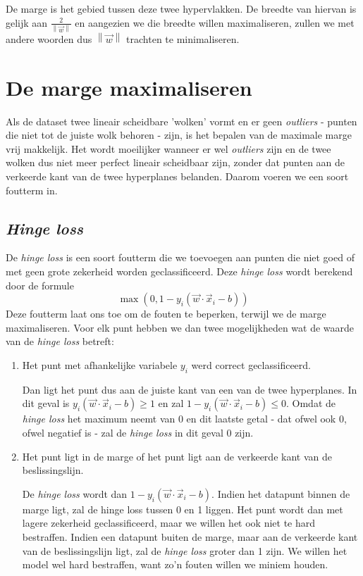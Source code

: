 \documentclass[twoside, kulak]{kulakreport}
\newcommand{\norm}[1]{\left\| #1 \right\|}
\begin{document}
	De marge is het gebied tussen deze twee hypervlakken. De breedte van hiervan is gelijk aan \(\frac{2}{\norm{\vec{w}}}\) en aangezien we die breedte willen maximaliseren, zullen we met andere woorden dus \(\norm{\vec{w}}\) trachten te minimaliseren.
	
	\section{De marge maximaliseren}
	
	Als de dataset twee lineair scheidbare 'wolken' vormt en er geen \textit{outliers} - punten die niet tot de juiste wolk behoren - zijn, is het bepalen van de maximale marge vrij makkelijk. Het wordt moeilijker wanneer er wel \textit{outliers} zijn en de twee wolken dus niet meer perfect lineair scheidbaar zijn, zonder dat punten aan de verkeerde kant van de twee hyperplanes belanden. Daarom voeren we een soort foutterm in. 
	
	\subsection{\textit{Hinge loss}}
	
	De \textit{hinge loss} is een soort foutterm die we toevoegen aan punten die niet goed of met geen grote zekerheid worden geclassificeerd. Deze \textit{hinge loss} wordt berekend door de formule \[\max{(0,1-y_i(\vec{w}\cdot\vec{x}_i-b))}\] Deze foutterm laat ons toe om de fouten te beperken, terwijl we de marge maximaliseren. Voor elk punt hebben we dan twee mogelijkheden wat de waarde van de \textit{hinge loss} betreft:
	
	\begin{enumerate}
		\item Het punt met afhankelijke variabele \(y_i\) werd correct geclassificeerd.
		
		Dan ligt het punt dus aan de juiste kant van een van de twee hyperplanes. In dit geval is \(y_i(\vec{w}\cdot\vec{x}_i-b)\ge1\) en zal \(1 - y_i(\vec{w}\cdot\vec{x}_i-b)\le0\). Omdat de \textit{hinge loss} het maximum neemt van 0 en dit laatste getal - dat ofwel ook 0, ofwel negatief is - zal de \textit{hinge loss} in dit geval 0 zijn.
		
		\item Het punt ligt in de marge of het punt ligt aan de verkeerde kant van de beslissingslijn. 
		
		De \textit{hinge loss} wordt dan \(1 - y_i(\vec{w}\cdot\vec{x}_i - b)\). Indien het datapunt binnen de marge ligt, zal de hinge loss tussen 0 en 1 liggen. Het punt wordt dan met lagere zekerheid geclassificeerd, maar we willen het ook niet te hard bestraffen. Indien een datapunt buiten de marge, maar aan de verkeerde kant van de beslissingslijn ligt, zal de \textit{hinge loss} groter dan 1 zijn. We willen het model wel hard bestraffen, want zo'n fouten willen we miniem houden.
	\end{enumerate}
	
\end{document}
